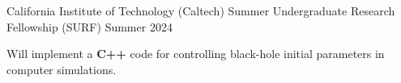 \begin{entry}{California Institute of Technology (Caltech)}
	\entryItem
		{Summer Undergraduate Research Fellowship (SURF)}
		{Summer 2024}

		\begin{items}
			\item Will implement a \textbf{C++} code for controlling black-hole initial parameters in computer simulations.
		\end{items}
\end{entry}
